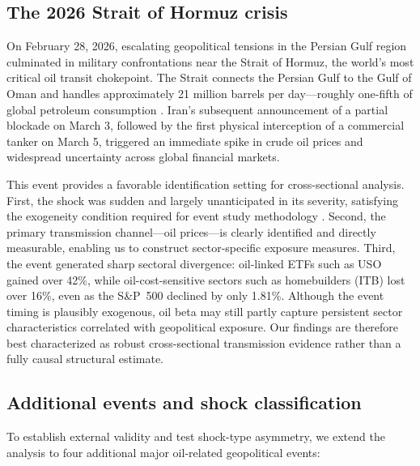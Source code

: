 \documentclass[12pt,preprint,authoryear]{elsarticle}
\begin{document}
\subsection{The 2026 Strait of Hormuz crisis}
On February 28, 2026, escalating geopolitical tensions in the Persian Gulf region culminated in military confrontations near the Strait of Hormuz, the world's most critical oil transit chokepoint. The Strait connects the Persian Gulf to the Gulf of Oman and handles approximately 21 million barrels per day---roughly one-fifth of global petroleum consumption \citep{eia2023hormuz}. Iran's subsequent announcement of a partial blockade on March 3, followed by the first physical interception of a commercial tanker on March 5, triggered an immediate spike in crude oil prices and widespread uncertainty across global financial markets.

This event provides a favorable identification setting for cross-sectional analysis. First, the shock was sudden and largely unanticipated in its severity, satisfying the exogeneity condition required for event study methodology \citep{mackinlay1997event}. Second, the primary transmission channel---oil prices---is clearly identified and directly measurable, enabling us to construct sector-specific exposure measures. Third, the event generated sharp sectoral divergence: oil-linked ETFs such as USO gained over 42\%, while oil-cost-sensitive sectors such as homebuilders (ITB) lost over 16\%, even as the S\&P~500 declined by only 1.81\%. Although the event timing is plausibly exogenous, oil beta may still partly capture persistent sector characteristics correlated with geopolitical exposure. Our findings are therefore best characterized as robust cross-sectional transmission evidence rather than a fully causal structural estimate.

\subsection{Additional events and shock classification}
To establish external validity and test shock-type asymmetry, we extend the analysis to four additional major oil-related geopolitical events:
\end{document}
